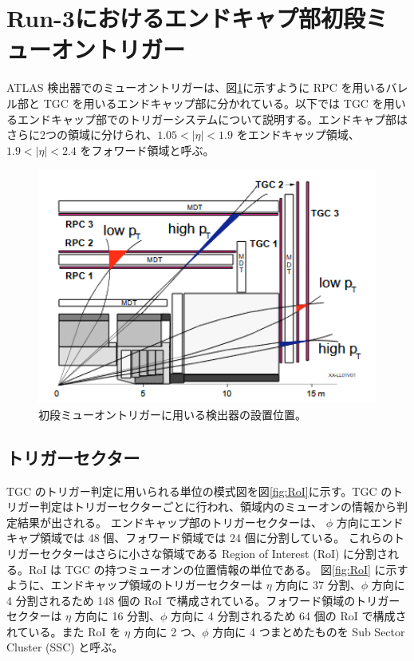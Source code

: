 \section{Run-3におけるエンドキャプ部初段ミューオントリガー}
ATLAS 検出器でのミューオントリガーは、図\ref{fig:muon}に示すように RPC を用いるバレル部と TGC を用いるエンドキャップ部に分かれている。以下では TGC を用いるエンドキャップ部でのトリガーシステムについて説明する。エンドキャプ部はさらに2つの領域に分けられ、$1.05 < |\eta| < 1.9$ をエンドキャップ領域、$1.9 < |\eta| < 2.4$ をフォワード領域と呼ぶ。

\begin{figure}[tb]
  \centering
  \includegraphics[clip, width=14cm]{fig/3/muon_trigger_overview.png}
  \caption{初段ミューオントリガーに用いる検出器の設置位置。}
  \label{fig:muon}
\end{figure}

\subsection{トリガーセクター}
TGC のトリガー判定に用いられる単位の模式図を図\ref{fig:RoI}に示す。TGC のトリガー判定はトリガーセクターごとに行われ、領域内のミューオンの情報から判定結果が出される。
エンドキャップ部のトリガーセクターは、 $\phi$ 方向にエンドキャプ領域では 48 個、フォワード領域では 24 個に分割している。
これらのトリガーセクターはさらに小さな領域である Region of Interest (RoI) に分割される。RoI は TGC の持つミューオンの位置情報の単位である。
図\ref{fig:RoI} に示すように、エンドキャップ領域のトリガーセクターは $\eta$ 方向に 37 分割、$\phi$ 方向に 4 分割されるため 148 個の RoI で構成されている。フォワード領域のトリガーセクターは $\eta$ 方向に 16 分割、$\phi$ 方向に 4 分割されるため 64 個の RoI で構成されている。また RoI を $\eta$ 方向に 2 つ、$\phi$ 方向に 4 つまとめたものを Sub Sector Cluster (SSC) と呼ぶ。

